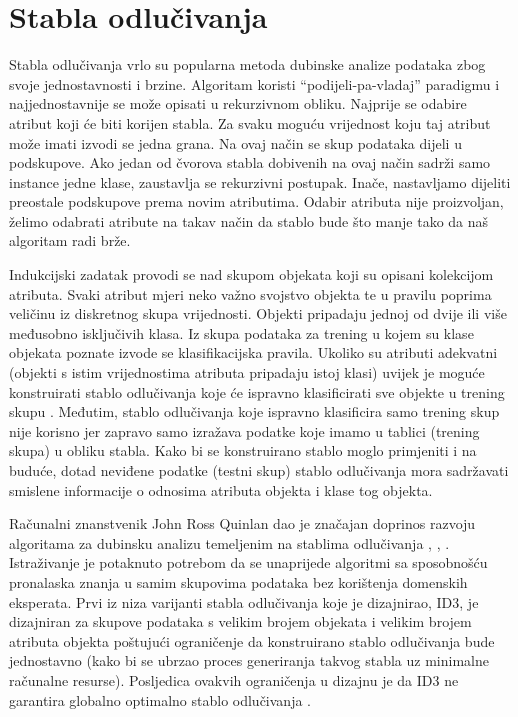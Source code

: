 \section{Stabla odlučivanja}
\label{ch:ch4}

Stabla odlučivanja vrlo su popularna metoda dubinske analize podataka zbog svoje jednostavnosti i brzine. Algoritam koristi “podijeli-pa-vladaj” paradigmu i najjednostavnije se može opisati u rekurzivnom obliku. Najprije se odabire atribut koji će biti korijen stabla. Za svaku moguću vrijednost koju taj atribut može imati izvodi se jedna grana. Na ovaj način se skup podataka dijeli u podskupove. Ako jedan od čvorova stabla dobivenih na ovaj način sadrži samo instance jedne klase, zaustavlja se rekurzivni postupak. Inače, nastavljamo dijeliti preostale podskupove prema novim atributima. Odabir atributa nije proizvoljan, želimo odabrati atribute na takav način da stablo bude što manje tako da naš algoritam radi brže. 

Indukcijski zadatak provodi se nad skupom objekata koji su opisani kolekcijom atributa. Svaki atribut mjeri neko važno svojstvo objekta te u pravilu poprima veličinu iz diskretnog skupa vrijednosti. Objekti pripadaju jednoj od dvije ili više međusobno isključivih klasa. Iz skupa podataka za trening u kojem su klase objekata poznate izvode se klasifikacijska pravila. Ukoliko su atributi adekvatni (objekti s istim vrijednostima atributa pripadaju istoj klasi) uvijek je moguće konstruirati stablo odlučivanja koje će ispravno klasificirati sve objekte u trening skupu \cite{Witten01}. 
Međutim, stablo odlučivanja koje ispravno klasificira samo trening skup nije korisno jer zapravo samo izražava podatke koje imamo u tablici (trening skupa) u obliku stabla. Kako bi se  konstruirano stablo moglo primjeniti i na buduće, dotad neviđene podatke (testni skup) stablo odlučivanja mora sadržavati smislene informacije o odnosima atributa objekta i klase tog objekta. 

Računalni znanstvenik John Ross Quinlan dao je značajan doprinos razvoju algoritama za dubinsku analizu temeljenim na stablima odlučivanja \cite{Quinlan01}, \cite{Quinlan02}, \cite{Wu01}. Istraživanje je potaknuto potrebom da se unaprijede algoritmi sa sposobnošću pronalaska znanja u samim skupovima podataka bez korištenja domenskih eksperata. Prvi iz niza varijanti stabla odlučivanja koje je dizajnirao, ID3, je dizajniran za skupove podataka s velikim brojem objekata i velikim brojem atributa objekta poštujući ograničenje da konstruirano stablo odlučivanja bude jednostavno (kako bi se ubrzao proces generiranja takvog stabla uz minimalne računalne resurse). Posljedica ovakvih ograničenja u dizajnu je da ID3 ne garantira globalno optimalno stablo odlučivanja \cite{Quinlan02}.

